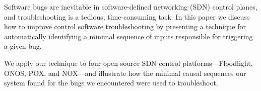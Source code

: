 Software bugs are inevitable in software-defined networking (SDN) control planes,
and troubleshooting
is a tedious, time-consuming task.
In this paper we discuss how to improve
control software troubleshooting by presenting a technique
for automatically identifying
a minimal sequence of inputs responsible for triggering a given bug.

We apply our technique to \num{four} open source SDN control
platforms---Floodlight, ONOS, POX, and NOX---and
illustrate how the minimal causal sequences our system found for the bugs we
encountered were used to troubleshoot.
